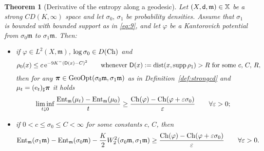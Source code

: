 \documentclass[reqno,11pt]{article}
\numberwithin{equation}{section}
\newcommand{\C}{\mathbb{C}}
\newcommand{\mm}{{\mbox{\boldmath$m$}}}
\newcommand{\ppi}{{\mbox{\boldmath$\pi$}}}
\newcommand{\sfd}{{\sf d}}
\newcommand{\sfD}{{\sf D}}
\newcommand{\rme}{{\mathrm e}}
\newcommand{\supp}{\mathop{\rm supp}\nolimits}   %
\newcommand{\eps}{\varepsilon}
\newtheorem{theorem}{Theorem}[section]
\newcommand{\ent}[1]{{\rm Ent}_{\mm}(#1)}              %
\newcommand{\e}{{\rm{e}}}                           %
\newcommand{\gopt}{{\rm{GeoOpt}}}                   %
\newcommand{\X}{\mathbb X}
\renewcommand{\C}{{\rm Ch}}
\renewcommand{\mm}{\mathfrak m}
\begin{document}
\begin{theorem}[Derivative of the entropy along a geodesic]\label{thm:derentr}
Let $(X,\sfd,\mm)\in\X$ be a strong $CD(K,\infty)$ space and let
$\sigma_0,\,\sigma_1$ be probability densities. Assume that
$\sigma_1$ is bounded with bounded support as in \eqref{eq:9}, and
let $\varphi$ be a Kantorovich potential from $\sigma_0\mm$ to
$\sigma_1\mm$. Then:
\begin{itemize}
\item[(a)] if $\varphi\in L^2(X,\mm)$, $\log\sigma_0\in D(\C)$ and
\begin{equation}\label{eq:boundrhoo0}
\rho_0(x)\leq c\,\rme^{-9K^-(\sfD(x)-C)^2}\qquad\text{whenever
$\sfD(x):=\mathrm{dist}(x,\supp\rho_1)>R$ for some $c,\,C,\,R$,}
\end{equation}
then for any $\ppi\in\gopt(\sigma_0\mm,\sigma_1\mm)$ as in
Definition~\ref{def:strongcd} and $\mu_t=(\e_t)_\sharp\ppi$ it holds
\begin{equation}
\label{eq:derentropia1} \liminf_{t\downarrow
0}\frac{\ent{\mu_t}-\ent{\mu_0}}{t}\geq
\frac{\C(\varphi)-\C(\varphi+\eps\sigma_0)}{\eps}\qquad\forall\eps>0;
\end{equation}
\item[(b)] if $0<c\leq\sigma_0\leq C<\infty$ for some constants
$c,\,C$, then
\begin{equation}
\label{eq:derentropia}
\ent{\sigma_1\mm}-\ent{\sigma_0\mm}-\frac{K}{2}W_2^2(\sigma_0\mm,\sigma_1\mm)\geq
\frac{\C(\varphi)-\C(\varphi+\eps\sigma_0)}{\eps}\qquad\forall\eps>0.
\end{equation}
\end{itemize}
\end{theorem}
\end{document}
